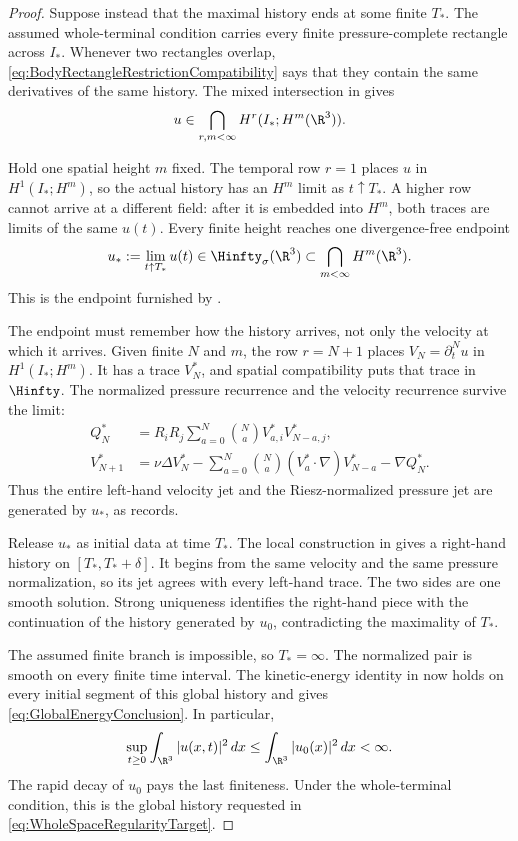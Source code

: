 \begin{proof}
Suppose instead that the maximal history ends at some finite \(T_*\).  The
assumed whole-terminal condition carries every finite pressure-complete
rectangle across \(I_*\).  Whenever two rectangles overlap,
\eqref{eq:BodyRectangleRestrictionCompatibility} says that they contain the
same derivatives of the same history.  The mixed intersection in
 gives
\[
  u\in\bigcap_{r,m<\infty}H^r(I_*;H^m(\R^3)).
\]

Hold one spatial height \(m\) fixed.  The temporal row \(r=1\) places \(u\)
in \(H^1(I_*;H^m)\), so the actual history has an \(H^m\) limit as
\(t\uparrow T_*\).  A higher row cannot arrive at a different field: after it
is embedded into \(H^m\), both traces are limits of the same \(u(t)\).  Every
finite height reaches one divergence-free endpoint
\begin{equation}\label{eq:BodyCommonSmoothEndpoint}
  u_*:=\lim_{t\uparrow T_*}u(t)
  \in\Hinfty_\sigma(\R^3)
  \subset\bigcap_{m<\infty}H^m(\R^3).
\end{equation}
This is the endpoint furnished by .

The endpoint must remember how the history arrives, not only the velocity at
which it arrives.  Given
finite \(N\) and \(m\), the row \(r=N+1\) places
\(V_N=\partial_t^Nu\) in \(H^1(I_*;H^m)\).  It has a trace \(V_N^*\), and
spatial compatibility puts that trace in \(\Hinfty\).  The normalized pressure
recurrence and the velocity recurrence survive the limit:
\begin{align*}
  Q_N^*
  &=R_iR_j\sum_{a=0}^{N}\binom{N}{a}V_{a,i}^*V_{N-a,j}^*,
  \\
  V_{N+1}^*
  &=\nu\Delta V_N^*
  -\sum_{a=0}^{N}\binom{N}{a}(V_a^*\cdot\nabla)V_{N-a}^*
  -\nabla Q_N^*.
\end{align*}
Thus the entire left-hand velocity jet and the Riesz-normalized pressure jet
are generated by \(u_*\), as  records.

Release \(u_*\) as initial data at time \(T_*\).  The local construction in
 gives a right-hand history on
\([T_*,T_*+\delta]\).  It begins from the same velocity and the same pressure
normalization, so its jet agrees with every left-hand trace.  The two sides are
one smooth solution.  Strong uniqueness identifies the right-hand piece with
the continuation of the history generated by \(u_0\), contradicting the
maximality of \(T_*\).

The assumed finite branch is impossible, so \(T_*=\infty\).  The normalized
pair is smooth on every finite time interval.  The kinetic-energy identity in
 now holds on every initial segment
of this global history and gives \eqref{eq:GlobalEnergyConclusion}.  In
particular,
\[
  \sup_{t\geq0}\int_{\R^3}|u(x,t)|^2\,dx
  \leq
  \int_{\R^3}|u_0(x)|^2\,dx
  <\infty.
\]
The rapid decay of \(u_0\) pays the last finiteness.  Under the whole-terminal
condition, this is the global history requested in
\eqref{eq:WholeSpaceRegularityTarget}.
\end{proof}

